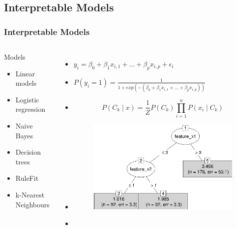 \documentclass{beamer}\usepackage[]{graphicx}\usepackage[]{color}
\begin{document}
\subsection{Interpretable Models} %
\begin{frame}[fragile]
\frametitle{Interpretable Models}
\begin{columns}[c] %
\begin{block}{Models}
\begin{itemize}
\item Linear models 
\item Logistic regression 
\item Naive Bayes
\item Decision trees 
\item RuleFit\footnotemark
\item k-Nearest Neighbours
\end{itemize}
\end{block}
\footnotesize
\begin{itemize}
\item[] $y_i = \beta_0 + \beta_1 x_{i,1} + \ldots + \beta_p x_{i,p} + \epsilon_i$
\item[] $P(y_i = 1) = \frac{1}{1+exp(-(\beta_0+\beta_1 x_{i,1} + \ldots + \beta_p x_{i,p}))}$
\item[] \begin{equation*}P(C_k \mid x) = \frac{1}{Z} P(C_k) \prod_{i=1}^n P(x_i \mid C_k)\end{equation*}
\item[] 
\begin{figure}
	\includegraphics[width=0.5\linewidth]{tree_example.png}
\end{figure}
\item[] 
\begin{figure}

\end{figure}
\end{itemize}
\end{columns}
\end{frame}
\end{document}
